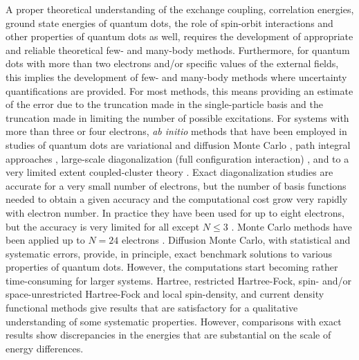 \documentclass[twocolumn]{revtex4}
\begin{document}
A proper theoretical understanding of the exchange coupling, correlation energies, 
ground state energies of quantum dots, the role of spin-orbit interactions
and other properties of quantum dots as well, requires the development of appropriate and reliable  
theoretical  few- and many-body methods. 
Furthermore, for quantum dots with more than two electrons and/or specific values of the 
external fields, this implies the development of few- and many-body methods where   
uncertainty
quantifications are provided.  
For most methods, this means providing an estimate of the error due 
to the truncation made in the single-particle basis and the truncation made in 
limiting the number of possible excitations.
For systems with more than three or four electrons,  {\em ab initio} methods that have 
been employed in studies of quantum dots are
 variational and diffusion Monte Carlo \cite{harju2005,pederiva2001, pederiva2003}, path integral approaches \cite{pi1999}, 
large-scale diagonalization (full configuration 
interaction) \cite{Eto97,Maksym90,simen2008,modena2000}, and to a very limited extent 
coupled-cluster theory \cite{shavittbartlett2009,bartlett2007,bartlett2003,indians,us2011}. 
Exact diagonalization studies are accurate for a very small number
of electrons, but the number of basis functions needed to obtain a given
accuracy and the computational cost grow very rapidly with electron number.
In practice they have been used for up to eight electrons\cite{Eto97,Maksym90,modena2000}, but the accuracy is
very limited for all except $N\le 3$ .  
Monte Carlo methods have been applied up to $N=24$ electrons 
\cite{pederiva2001,pederiva2003}. Diffusion Monte Carlo, with statistical and systematic errors, provide, in principle,
exact benchmark solutions to various properties of quantum dots. However, 
the computations start becoming rather time-consuming for larger systems.   
Hartree\cite{Kum90}, restricted Hartree-Fock, spin- and/or space-unrestricted
Hartree-Fock\cite{Fuj96,Mul96,Yan99} and
local spin-density, and current density functional methods\cite{Kos97,Hir99,finns1,finns2}
give results that are satisfactory for a qualitative understanding of some
systematic properties. However, comparisons with exact results show
discrepancies in the energies that are substantial
on the scale of energy differences. 
\end{document}

